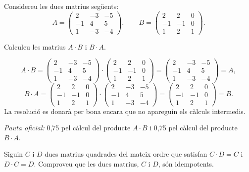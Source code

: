 Considereu les dues matrius següents:
\[
A=\begin{pmatrix}2&-3&-5\\-1&4&5\\1&-3&-4\end{pmatrix},\qquad B=\begin{pmatrix}2&2&0\\-1&-1&0\\1&2&1\end{pmatrix}.
\]

\begin{apartats}

Calculeu les matrius $A\cdot B$ i $B\cdot A$.

\begin{solucio}
\[
A\cdot B=\begin{pmatrix}2&-3&-5\\-1&4&5\\1&-3&-4\end{pmatrix}\cdot\begin{pmatrix}2&2&0\\-1&-1&0\\1&2&1\end{pmatrix}
=\begin{pmatrix}2&-3&-5\\-1&4&5\\1&-3&-4\end{pmatrix}=A,
\]
\[
B\cdot A=\begin{pmatrix}2&2&0\\-1&-1&0\\1&2&1\end{pmatrix}\cdot\begin{pmatrix}2&-3&-5\\-1&4&5\\1&-3&-4\end{pmatrix}
=\begin{pmatrix}2&2&0\\-1&-1&0\\1&2&1\end{pmatrix}=B .
\]
La resolució es donarà per bona encara que no apareguin els càlculs intermedis.

\textit{Pauta oficial:} 0,75 pel càlcul del producte $A\cdot B$ i 0,75 pel càlcul del producte $B\cdot A$.
\end{solucio}

Siguin $C$ i $D$ dues matrius quadrades del mateix ordre que satisfan $C\cdot D=C$ i $D\cdot C=D$. Comproveu que les dues
matrius, $C$ i $D$, són idempotents.


\end{apartats}

